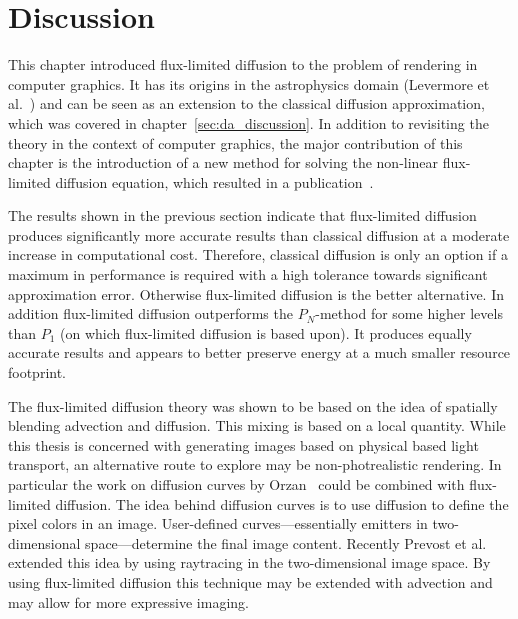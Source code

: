 \section{Discussion}
\label{sec:fld_discussion}

This chapter introduced flux-limited diffusion to the problem of rendering in computer graphics. It has its origins in the astrophysics domain (Levermore et al.~\cite{Levermore81}) and can be seen as an extension to the classical diffusion approximation, which was covered in chapter~\ref{sec:da_discussion}. In addition to revisiting the theory in the context of computer graphics, the major contribution of this chapter is the introduction of a new method for solving the non-linear flux-limited diffusion equation, which resulted in a publication~\cite{Koerner14}.

The results shown in the previous section indicate that flux-limited diffusion produces significantly more accurate results than classical diffusion at a moderate increase in computational cost. Therefore, classical diffusion is only an option if a maximum in performance is required with a high tolerance towards significant approximation error. Otherwise flux-limited diffusion is the better alternative. In addition flux-limited diffusion outperforms the $P_N$-method for some higher levels than $P_1$ (on which flux-limited diffusion is based upon). It produces equally accurate results and appears to better preserve energy at a much smaller resource footprint.

The flux-limited diffusion theory was shown to be based on the idea of spatially blending advection and diffusion. This mixing is based on a local quantity. While this thesis is concerned with generating images based on physical based light transport, an alternative route to explore may be non-photrealistic rendering. In particular the work on diffusion curves by Orzan~\cite{Orzan08} could be combined with flux-limited diffusion. The idea behind diffusion curves is to use diffusion to define the pixel colors in an image. User-defined curves---essentially emitters in two-dimensional space---determine the final image content. Recently Prevost et al.~\cite{Prevost15} extended this idea by using raytracing in the two-dimensional image space. By using flux-limited diffusion this technique may be extended with advection and may allow for more expressive imaging.


